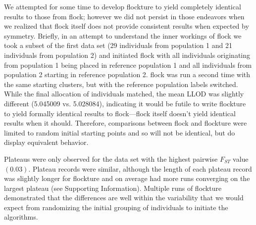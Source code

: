 We attempted for some time to develop {\sc flockture} to yield
completely identical results to those from {\sc flock}; however we did not
persist in those endeavors when we realized that {\sc flock} itself does
not provide consistent results when expected by symmetry.  Briefly, in an attempt to understand the
inner workings of {\sc flock} 
we took a subset of the 
first data set (29 individuals from population 1 and 21 individuals from population 2) and initiated 
{\sc flock} with all individuals originating from population 1 being placed in reference population 1 and all 
individuals from population 2 starting in reference population 2. {\sc flock} was run a second time
with the same starting clusters, but with the reference population labels switched. While the final allocation
of individuals matched, the mean LLOD was slightly different (5.045009 vs. 5.028084), indicating it would
be futile to write {\sc flockture} to yield formally identical results to {\sc flock}---{\sc flock} itself
doesn't yield identical results when it should. Therefore, comparisons
between {\sc flock} and {\sc flockture} were limited to random initial starting points and so will not 
be identical, but do display equivalent behavior. 

Plateaus were only observed for the data set 
with the highest pairwise $F_{ST}$ value $(0.03)$. Plateau records were similar, although %
the length of each plateau record was slightly longer for {\sc flockture} and on average had more runs converging on
the largest plateau (see Supporting Information). Multiple runs of {\sc flockture} demonstrated that the differences are well within the
variability that we would expect from randomizing the initial grouping of individuals to 
initiate the algorithms.

